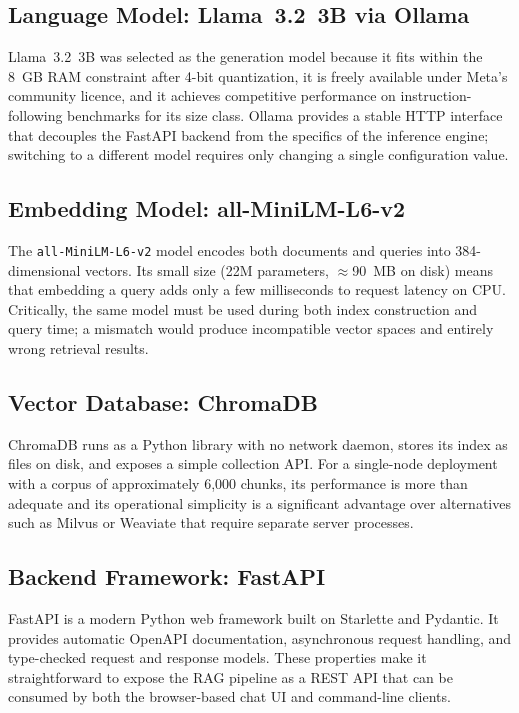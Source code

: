 \subsection{Language Model: Llama~3.2~3B via Ollama}

Llama~3.2~3B was selected as the generation model because it fits within the 8~GB RAM constraint after 4-bit quantization, it is freely available under Meta's community licence, and it achieves competitive performance on instruction-following benchmarks for its size class. Ollama provides a stable HTTP interface that decouples the FastAPI backend from the specifics of the inference engine; switching to a different model requires only changing a single configuration value.

\subsection{Embedding Model: all-MiniLM-L6-v2}

The \texttt{all-MiniLM-L6-v2} model encodes both documents and queries into 384-dimensional vectors. Its small size (22M parameters, $\approx$90~MB on disk) means that embedding a query adds only a few milliseconds to request latency on CPU. Critically, the same model must be used during both index construction and query time; a mismatch would produce incompatible vector spaces and entirely wrong retrieval results.

\subsection{Vector Database: ChromaDB}

ChromaDB runs as a Python library with no network daemon, stores its index as files on disk, and exposes a simple collection API. For a single-node deployment with a corpus of approximately 6{,}000 chunks, its performance is more than adequate and its operational simplicity is a significant advantage over alternatives such as Milvus or Weaviate that require separate server processes.

\subsection{Backend Framework: FastAPI}

FastAPI is a modern Python web framework built on Starlette and Pydantic. It provides automatic OpenAPI documentation, asynchronous request handling, and type-checked request and response models. These properties make it straightforward to expose the RAG pipeline as a REST API that can be consumed by both the browser-based chat UI and command-line clients.
